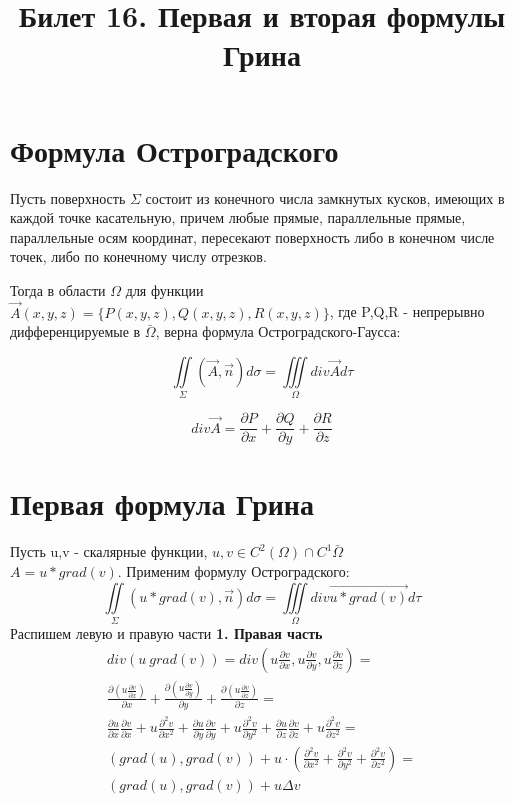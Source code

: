 \documentclass[11pt,a4paper]{article}
\title{Билет 16. Первая и вторая формулы Грина}
\date{}
\begin{document}
\maketitle
\section{Формула Остроградского}
	
Пусть поверхность $\varSigma$ состоит из конечного числа замкнутых кусков, имеющих в каждой точке касательную, причем любые прямые, параллельные прямые, параллельные осям координат, пересекают поверхность либо в конечном числе точек, либо по конечному числу отрезков.

Тогда в области $\varOmega$ для функции $\vec{A}(x,y,z) = \{P(x,y,z), Q(x,y,z), R(x,y,z)\}$, где P,Q,R - непрерывно дифференцируемые в $\bar{\varOmega}$, верна формула Остроградского-Гаусса:

$$
\iint \limits_{\varSigma} (\vec{A}, \vec{n})d\sigma = \iiint \limits_{\varOmega} div \vec{A} d\tau
$$

$$
div \vec{A} = \frac{\partial P}{\partial x} + \frac{\partial Q}{\partial y} + \frac{\partial R}{\partial z}
$$

\section{Первая формула Грина}
Пусть u,v - скалярные функции, $u,v \in C^2(\varOmega) \cap C^1{\bar{\varOmega}} $\\
$A = u * grad (v)$. Применим формулу Остроградского:
$$
\iint \limits_{\varSigma} (u * grad(v), \vec{n})d\sigma = \iiint \limits_{\varOmega} div \vec{u * grad(v)} d\tau
$$
Распишем левую и правую части
\textbf{1. Правая часть} \\
\begin{equation}
\begin{split}
div(u\ grad(v)) = div(u\frac{\partial v}{\partial x}, u\frac{\partial v}{\partial y}, u\frac{\partial v}{\partial z}) = \\
\frac{\partial(u\frac{\partial v}{\partial x})}{\partial x} + 
\frac{\partial(u\frac{\partial v}{\partial y})}{\partial y} +
\frac{\partial(u\frac{\partial v}{\partial z})}{\partial z} = \\
\frac{\partial u}{\partial x} \frac{\partial v}{\partial x} + 
u \frac{\partial^2 v}{\partial x^2} + 
\frac{\partial u}{\partial y} \frac{\partial v}{\partial y} + 
u \frac{\partial^2 v}{\partial y^2} + 
\frac{\partial u}{\partial z} \frac{\partial v}{\partial z} + 
u \frac{\partial^2 v}{\partial z^2} = \\
(grad(u), grad(v)) + u \cdot (
\frac{\partial^2 v}{\partial x^2} +
\frac{\partial^2 v}{\partial y^2} +
\frac{\partial^2 v}{\partial z^2}
) = \\
(grad(u), grad(v)) + u \Delta v
\end{split}
\end{equation}
\end{document}
